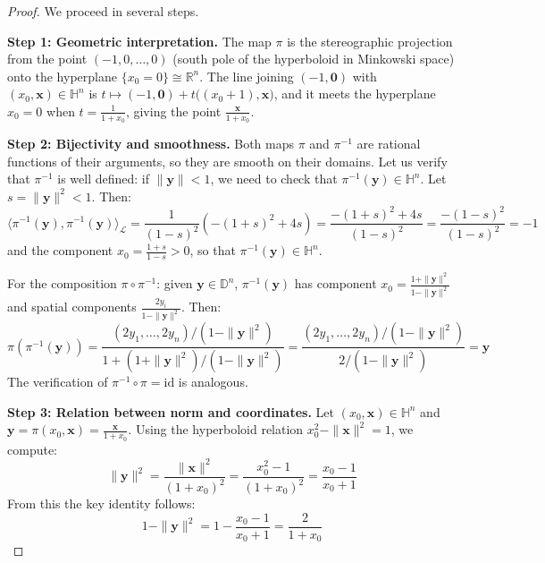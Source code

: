 \begin{proof}
We proceed in several steps.

\textbf{Step 1: Geometric interpretation.}
The map $\pi$ is the stereographic projection from the point $(-1, 0, \ldots, 0)$ (south pole of the hyperboloid in Minkowski space) onto the hyperplane $\{x_0 = 0\} \cong \mathbb{R}^n$. The line joining $(-1, \mathbf{0})$ with $(x_0, \mathbf{x}) \in \mathbb{H}^n$ is $t \mapsto (-1, \mathbf{0}) + t\bigl((x_0+1), \mathbf{x}\bigr)$, and it meets the hyperplane $x_0 = 0$ when $t = \frac{1}{1+x_0}$, giving the point $\frac{\mathbf{x}}{1+x_0}$.

\textbf{Step 2: Bijectivity and smoothness.}
Both maps $\pi$ and $\pi^{-1}$ are rational functions of their arguments, so they are smooth on their domains. Let us verify that $\pi^{-1}$ is well defined: if $\|\mathbf{y}\| < 1$, we need to check that $\pi^{-1}(\mathbf{y}) \in \mathbb{H}^n$. Let $s = \|\mathbf{y}\|^2 < 1$. Then:
\[
\langle \pi^{-1}(\mathbf{y}), \pi^{-1}(\mathbf{y}) \rangle_{\mathcal{L}} = \frac{1}{(1-s)^2}\left(-(1+s)^2 + 4s\right) = \frac{-(1+s)^2 + 4s}{(1-s)^2} = \frac{-(1-s)^2}{(1-s)^2} = -1
\]
and the component $x_0 = \frac{1+s}{1-s} > 0$, so that $\pi^{-1}(\mathbf{y}) \in \mathbb{H}^n$.

For the composition $\pi \circ \pi^{-1}$: given $\mathbf{y} \in \mathbb{D}^n$, $\pi^{-1}(\mathbf{y})$ has component $x_0 = \frac{1+\|\mathbf{y}\|^2}{1-\|\mathbf{y}\|^2}$ and spatial components $\frac{2y_i}{1-\|\mathbf{y}\|^2}$. Then:
\[
\pi(\pi^{-1}(\mathbf{y})) = \frac{(2y_1, \ldots, 2y_n)/(1-\|\mathbf{y}\|^2)}{1 + (1+\|\mathbf{y}\|^2)/(1-\|\mathbf{y}\|^2)} = \frac{(2y_1, \ldots, 2y_n)/(1-\|\mathbf{y}\|^2)}{2/(1-\|\mathbf{y}\|^2)} = \mathbf{y}
\]
The verification of $\pi^{-1} \circ \pi = \mathrm{id}$ is analogous.

\textbf{Step 3: Relation between norm and coordinates.}
Let $(x_0, \mathbf{x}) \in \mathbb{H}^n$ and $\mathbf{y} = \pi(x_0, \mathbf{x}) = \frac{\mathbf{x}}{1+x_0}$. Using the hyperboloid relation $x_0^2 - \|\mathbf{x}\|^2 = 1$, we compute:
\begin{equation}\label{eq:norma_y_hiperboloide}
\|\mathbf{y}\|^2 = \frac{\|\mathbf{x}\|^2}{(1+x_0)^2} = \frac{x_0^2 - 1}{(1+x_0)^2} = \frac{x_0 - 1}{x_0 + 1}
\end{equation}
From this the key identity follows:
\begin{equation}\label{eq:factor_conforme_clave}
1 - \|\mathbf{y}\|^2 = 1 - \frac{x_0 - 1}{x_0 + 1} = \frac{2}{1 + x_0}
\end{equation}


\end{proof}
